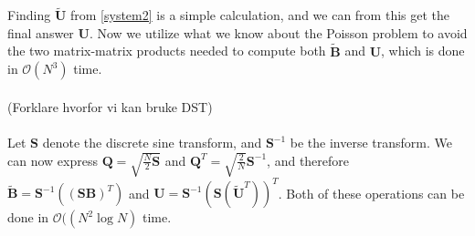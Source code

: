 \documentclass[10pt, a4paper]{article} %
\begin{document}
Finding $\mathbf{\widetilde{U}}$ from \eqref{system2} is a simple calculation, and we can from this get the final answer $\mathbf{U}$. Now we utilize what we know about the Poisson problem to avoid the two matrix-matrix products needed to compute both $\mathbf{\widetilde{B}}$ and $\mathbf{U}$, which is done in $\mathcal{O}(N^3)$ time. \\
\\
(Forklare hvorfor vi kan bruke DST)
\\
\\
Let $\mathbf{S}$ denote the discrete sine transform, and $\mathbf{S}^{-1}$ be the inverse transform. We can now express $\mathbf{Q} = \sqrt{\frac{N}{2}\mathbf{S}}$ and $\mathbf{Q}^T = \sqrt{\frac{2}{N}}\mathbf{S}^{-1}$, and therefore $\mathbf{\widetilde{B}} = \mathbf{S}^{-1}((\mathbf{SB})^T)$ and $\mathbf{U} = \mathbf{S}^{-1}(\mathbf{S}(\mathbf{\widetilde{U}}^T))^T$. Both of these operations can be done in $\mathcal{O}((N^2\log{N})$ time. 
%
%
\end{document}
